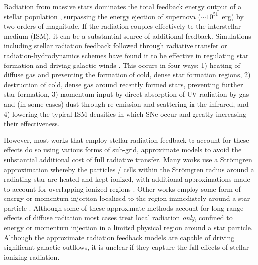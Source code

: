 \documentclass[twocolumn]{aastex62}
\begin{document}
Radiation from massive stars dominates the total feedback energy output of a stellar population 
\citep[e.g.][]{Abbott1982,Leitherer1999,Agertz2013}, surpassing the energy ejection of supernova ($\sim 10^{51}$~erg) by two orders of magnitude. If the radiation couples effectively to the interstellar medium (ISM), it can be a substantial source of additional feedback. %
Simulations including stellar radiation feedback followed through radiative transfer or radiation-hydrodynamics schemes have found it to be effective in regulating star formation and driving galactic winds \citep[e.g.][]{WiseAbel2012,Kim2013a,Sales2014,Oshea2015,Rosdahl2015,Ocvirk2015,Pawlik2015,Peters2017}. This occurs in four ways: 1) heating 
   of diffuse 
gas and preventing the formation of cold, dense star formation regions, 2) destruction of cold, dense gas around recently formed stars, preventing further star formation, 3) momentum input by direct absorption of UV radiation by gas and (in some cases) dust through re-emission and scattering in the infrared, and 4) lowering the typical ISM densities in which SNe occur and greatly increasing their effectiveness. %

However, most works that employ stellar radiation feedback to account for these effects do so using various forms of sub-grid, approximate models to avoid the substantial additional cost of full radiative transfer. Many works use a Str{\"o}mgren approximation whereby the particles / cells within the Str{\"o}mgren radius around a radiating star are heated and kept ionized, with additional approximations made to account for overlapping ionized regions \citep[e.g.][]{HQM2011,Hu2016,Hu2017}. Other works employ some form of energy or momentum injection localized to the region immediately around a star particle \citep[e.g.][(\textit{need more})]{Agertz2013,Roskar2014,Ceverino2014,Forbes2016}. Although some of these approximate methods account for long-range effects of diffuse radiation \citep{HQM2012,Hopkins2018} most cases treat local radiation {\it only}, confined to energy or momentum injection in a limited physical region around a star particle. Although the approximate radiation feedback models are capable of driving significant galactic outflows, it is unclear if they capture the full effects of stellar ionizing radiation. 
\end{document}
